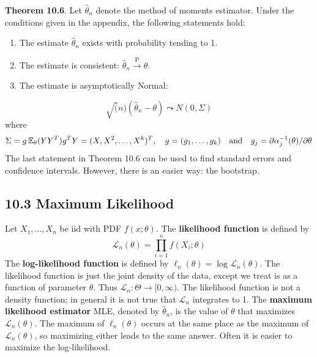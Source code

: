 \textbf{Theorem 10.6}. Let \(\hat{\theta}_{n}\) denote the method of
moments estimator. Under the conditions given in the appendix, the
following statements hold:
\begin{enumerate}
\def\labelenumi{(\arabic{enumi})}
\item
  The estimate \(\hat{\theta}_{n}\) exists with probability tending to 1.
\item
  The estimate is consistent:
  \(\hat{\theta}_{n} \xrightarrow{\textrm{P}} \theta\).
\item
  The estimate is asymptotically Normal:
\end{enumerate}
\[
\sqrt(n)(\hat{\theta}_{n} - \theta) \leadsto N(0, \Sigma)
\]
where
\[
\Sigma = g \operatorname{\mathbb{E}}_{\theta} (Y Y^T) g^T \\
Y = (X, X^{2}, \dots, X^{k})^T, \quad g = (g_{1}, \dots, g_{k}) \quad \text{and} \quad g_{j} = \partial \alpha_{j}^{-1}(\theta)/\partial\theta
\]
The last statement in Theorem 10.6 can be used to find standard errors
and confidence intervals. However, there is an easier way: the
bootstrap.

\subsection*{10.3 Maximum Likelihood}\label{maximum-likelihood}
Let \(X_{1}, \dots, X_{n}\) be iid with PDF \(f(x; \theta)\).
The \textbf{likelihood function} is defined by
\[
\mathcal{L}_{n}(\theta) = \prod_{i=1}^{n} f(X_{i}; \theta)
\]
The \textbf{log-likelihood function} is defined by
\(\ell_{n}(\theta) = \log \mathcal{L}_{n}(\theta)\).
The likelihood function is just the joint density of the data, except we
treat is as a function of parameter \(\theta\). Thus
\(\mathcal{L}_{n} : \Theta \rightarrow [0, \infty)\). The likelihood
function is not a density function; in general it is not true that
\(\mathcal{L}_{n}\) integrates to 1.
The \textbf{maximum likelihood estimator} MLE, denoted by
\(\hat{\theta}_{n}\), is the value of \(\theta\) that maximizes
\(\mathcal{L}_{n}(\theta)\).
The maximum of \(\ell_{n}(\theta)\) occurs at the same place as the
maximum of \(\mathcal{L}_{n}(\theta)\), so maximizing either leads to the
same answer. Often it is easier to maximize the log-likelihood.


